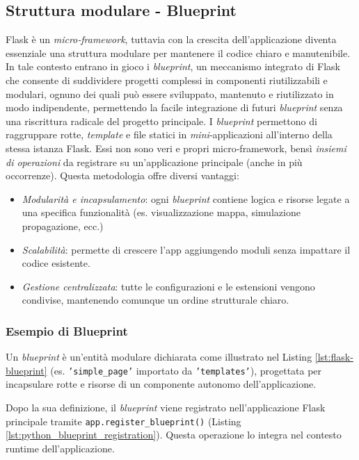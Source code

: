 \subsection{Struttura modulare - Blueprint}
\label{ss:blueprint}

Flask è un \textit{micro‑framework}, tuttavia con la crescita dell'applicazione diventa
essenziale una struttura modulare per mantenere il codice chiaro e manutenibile.
In tale contesto entrano in gioco i \textit{blueprint}, un meccanismo integrato
di Flask che consente di suddividere progetti complessi in componenti
riutilizzabili e modulari, ognuno dei quali può essere sviluppato, mantenuto e
riutilizzato in modo indipendente, permettendo la facile integrazione di futuri \textit{blueprint}
senza una riscrittura radicale del progetto principale. I \textit{blueprint}
permettono di raggruppare rotte, \textit{template} e file statici in \textit{mini}‑applicazioni
all'interno della stessa istanza Flask. Essi non sono veri e propri micro‑framework,
bensì \textit{insiemi di operazioni} da registrare su un'applicazione principale
(anche in più occorrenze). Questa metodologia offre diversi vantaggi: \cite{palets_blueprints}

\begin{itemize}
  \item \emph{Modularità e incapsulamento}: ogni \textit{blueprint} contiene
    logica e risorse legate a una specifica funzionalità (es. visualizzazione
    mappa, simulazione propagazione, ecc.)

  \item \emph{Scalabilità}: permette di crescere l'app aggiungendo moduli senza impattare
    il codice esistente.

  \item \emph{Gestione centralizzata}: tutte le configurazioni e le estensioni vengono
    condivise, mantenendo comunque un ordine strutturale chiaro.
\end{itemize}

\subsubsection{Esempio di Blueprint}

Un \textit{blueprint} è un'entità modulare dichiarata come illustrato nel Listing
\ref{lst:flask-blueprint} (es. \texttt{'simple\_page'} importato da \texttt{'templates'}),
progettata per incapsulare rotte e risorse di un componente autonomo dell'applicazione.

Dopo la sua definizione, il \textit{blueprint} viene registrato nell'applicazione
Flask principale tramite \texttt{app.register\_blueprint()} (Listing \ref{lst:python_blueprint_registration}).
Questa operazione lo integra nel contesto runtime dell'applicazione.


